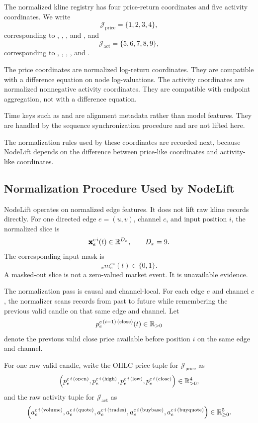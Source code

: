 The normalized kline registry has four price-return coordinates and five
activity coordinates.  We write
\[
  \mathcal{J}_{\mathrm{price}}
  =
  \{1,2,3,4\},
\]
corresponding to , , , and
, and
\[
  \mathcal{J}_{\mathrm{act}}
  =
  \{5,6,7,8,9\},
\]
corresponding to , , ,
, and .

The price coordinates are normalized log-return coordinates.  They are
compatible with a difference equation on node log-valuations.  The activity
coordinates are normalized nonnegative activity coordinates.  They are
compatible with endpoint aggregation, not with a difference equation.

Time keys such as  and  are alignment
metadata rather than model features.  They are handled by the sequence
synchronization procedure and are not lifted here.

The normalization rules used by these coordinates are recorded next, because
NodeLift depends on the difference between price-like coordinates and
activity-like coordinates.

\subsection{Normalization Procedure Used by NodeLift}
\label{subsec:nodelift-normalization-procedure}

NodeLift operates on normalized edge features.  It does not lift raw kline
records directly.  For one directed edge $e=(u,v)$, channel $c$, and input
position $i$, the normalized slice is
\[
  \pmb{\mathbf{x}}_{e}^{c\,i}(t)
  \in
  \mathbb{R}^{D_x},
  \qquad
  D_x=9.
\]
The corresponding input mask is
\[
  {}_{x}m_{e}^{c\,i}(t)
  \in
  \{0,1\}.
\]
A masked-out slice is not a zero-valued market event.  It is unavailable
evidence.

The normalization pass is causal and channel-local.  For each edge $e$ and
channel $c$, the normalizer scans records from past to future while remembering
the previous valid candle on that same edge and channel.  Let
\[
  p_{e}^{c\,(i-1)\,(\mathrm{close})}(t)\in\mathbb{R}_{>0}
\]
denote the previous valid close price available before position $i$ on the same
edge and channel.

For one raw valid candle, write the OHLC price tuple for $\mathcal{J}_{\mathrm{price}}$ as
\[
  \left(
    p_{e}^{c\,i\,(\mathrm{open})},
    p_{e}^{c\,i\,(\mathrm{high})},
    p_{e}^{c\,i\,(\mathrm{low})},
    p_{e}^{c\,i\,(\mathrm{close})}
  \right)
  \in
  \mathbb{R}_{>0}^4,
\]
and the raw activity tuple for $\mathcal{J}_{\mathrm{act}}$ as
\[
  \left(
    a_{e}^{c\,i\,(\mathrm{volume})},
    a_{e}^{c\,i\,(\mathrm{quote})},
    a_{e}^{c\,i\,(\mathrm{trades})},
    a_{e}^{c\,i\,(\mathrm{buybase})},
    a_{e}^{c\,i\,(\mathrm{buyquote})}
  \right)
  \in
  \mathbb{R}_{\ge 0}^5.
\]

